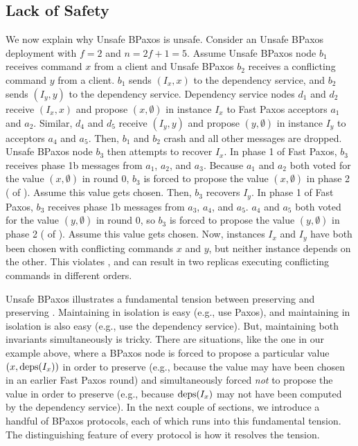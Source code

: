 \subsection{Lack of Safety}
We now explain why Unsafe BPaxos is unsafe. Consider an Unsafe BPaxos
deployment with $f = 2$ and $n = 2f + 1 = 5$.
%
Assume Unsafe BPaxos node $b_1$ receives command $x$ from a client and
Unsafe BPaxos $b_2$ receives a conflicting command $y$ from a client. $b_1$
sends $(I_x, x)$ to the dependency service, and $b_2$ sends $(I_y, y)$ to the
dependency service. Dependency service nodes $d_1$ and $d_2$ receive $(I_x, x)$
and propose $(x, \emptyset)$ in instance $I_x$ to Fast Paxos acceptors $a_1$
and $a_2$. Similar, $d_4$ and $d_5$ receive $(I_y, y)$ and propose $(y,
\emptyset)$ in instance $I_y$ to acceptors $a_4$ and $a_5$. Then, $b_1$ and
$b_2$ crash and all other messages are dropped. Unsafe BPaxos node $b_3$
then attempts to recover $I_x$. In phase 1 of Fast Paxos, $b_3$ receives phase
1b messages from $a_1$, $a_2$, and $a_3$. Because $a_1$ and $a_2$ both voted
for the value $(x, \emptyset{})$ in round $0$, $b_3$ is forced to propose the
value $(x, \emptyset)$ in phase 2 ( of
). Assume this value gets chosen. Then, $b_3$ recovers
$I_y$. In phase 1 of Fast Paxos, $b_3$ receives phase 1b messages from $a_3$,
$a_4$, and $a_5$. $a_4$ and $a_5$ both voted for the value $(y, \emptyset{})$
in round $0$, so $b_3$ is forced to propose the value $(y, \emptyset)$ in phase
2 ( of ). Assume this value gets
chosen. Now, instances $I_x$ and $I_y$ have both been chosen with conflicting
commands $x$ and $y$, but neither instance depends on the other. This violates
, and can result in two replicas executing
conflicting commands in different orders.

Unsafe BPaxos illustrates a fundamental tension between preserving
 and preserving .
Maintaining  in isolation is easy (e.g., use Paxos),
and maintaining  in isolation is also easy (e.g., use
the dependency service). But, maintaining both invariants simultaneously is
tricky. There are situations, like the one in our example above, where a BPaxos
node is forced to propose a particular value $(x, \text{deps}(I_x))$ in order to
preserve  (e.g., because the value may have been
chosen in an earlier Fast Paxos round) and simultaneously forced \emph{not} to
propose the value in order to preserve  (e.g.,
because $\text{deps}(I_x)$ may not have been computed by the dependency service).
%
In the next couple of sections, we introduce a handful of BPaxos protocols,
each of which runs into this fundamental tension. The distinguishing feature of
every protocol is how it resolves the tension.
